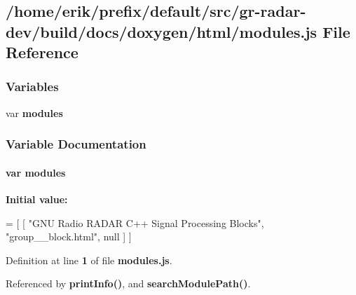 \subsection{/home/erik/prefix/default/src/gr-\/radar-\/dev/build/docs/doxygen/html/modules.js File Reference}
\label{modules_8js}
\subsubsection*{Variables}
\begin{DoxyCompactItemize}
\item 
var {\bf modules}
\end{DoxyCompactItemize}


\subsubsection{Variable Documentation}
\paragraph[{modules}]{\setlength{\rightskip}{0pt plus 5cm}var modules}\label{modules_8js_a4d77cb9bee576c07f3bbf9aec2c1278c}
{\bfseries Initial value\+:}
\begin{DoxyCode}
=
[
    [ \textcolor{stringliteral}{"GNU Radio RADAR C++ Signal Processing Blocks"}, \textcolor{stringliteral}{"group\_\_block.html"}, null ]
]
\end{DoxyCode}


Definition at line {\bf 1} of file {\bf modules.\+js}.



Referenced by {\bf print\+Info()}, and {\bf search\+Module\+Path()}.

